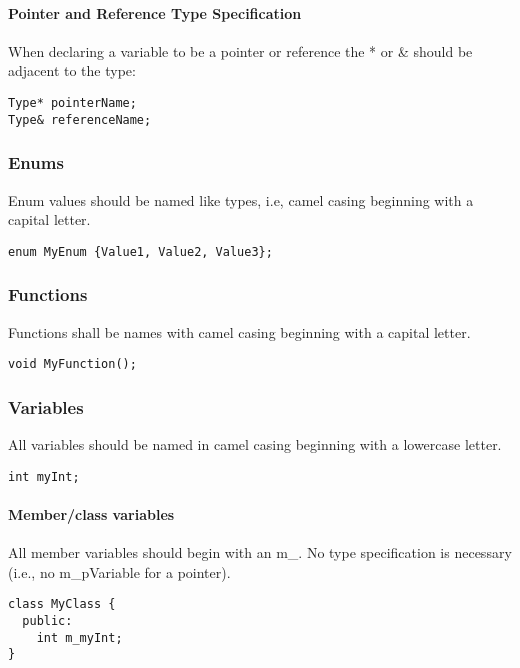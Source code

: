\documentclass[12pt]{article}
\begin{document}
\paragraph{Pointer and Reference Type Specification}

When declaring a variable to be a pointer or reference the * or \& should be
adjacent to the type:

\begin{lstlisting}
Type* pointerName;
Type& referenceName;
\end{lstlisting}

\subsubsection{Enums}
Enum values should be named like types, i.e, camel casing beginning with a
capital letter.

\begin{lstlisting}[mathescape]
enum MyEnum {Value1, Value2, Value3};
\end{lstlisting}

\subsubsection{Functions}
Functions shall be names with camel casing beginning with a capital letter.

\begin{lstlisting}
void MyFunction();
\end{lstlisting}

\subsubsection{Variables}

All variables should be named in camel casing beginning with a lowercase letter.

\begin{lstlisting}
int myInt;
\end{lstlisting}

\paragraph{Member/class variables}

All member variables should begin with an m\_. No type specification is
necessary (i.e., no m\_pVariable for a pointer).


\begin{lstlisting}[mathescape]
class MyClass {
  public:
    int m_myInt;
}
\end{lstlisting}
\end{document}
